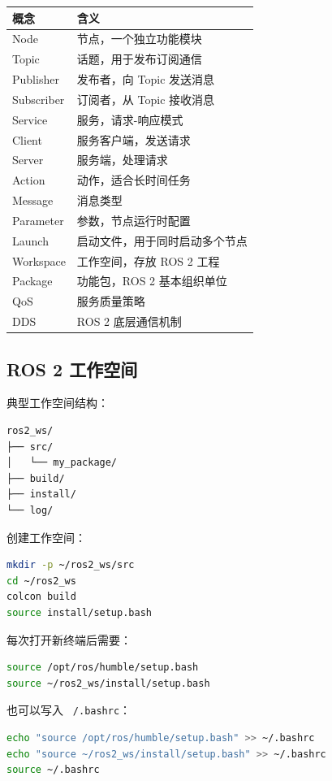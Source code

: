 \documentclass[UTF8,a4paper,12pt]{ctexart}
\begin{document}
\begin{longtable}{p{4cm}p{10cm}}
\toprule
概念 & 含义 \\
\midrule
Node & 节点，一个独立功能模块 \\
Topic & 话题，用于发布订阅通信 \\
Publisher & 发布者，向 Topic 发送消息 \\
Subscriber & 订阅者，从 Topic 接收消息 \\
Service & 服务，请求-响应模式 \\
Client & 服务客户端，发送请求 \\
Server & 服务端，处理请求 \\
Action & 动作，适合长时间任务 \\
Message & 消息类型 \\
Parameter & 参数，节点运行时配置 \\
Launch & 启动文件，用于同时启动多个节点 \\
Workspace & 工作空间，存放 ROS 2 工程 \\
Package & 功能包，ROS 2 基本组织单位 \\
QoS & 服务质量策略 \\
DDS & ROS 2 底层通信机制 \\
\bottomrule
\end{longtable}

\subsection{ROS 2 工作空间}

典型工作空间结构：

\begin{lstlisting}
ros2_ws/
├── src/
│   └── my_package/
├── build/
├── install/
└── log/
\end{lstlisting}

创建工作空间：

\begin{lstlisting}[language=bash]
mkdir -p ~/ros2_ws/src
cd ~/ros2_ws
colcon build
source install/setup.bash
\end{lstlisting}

每次打开新终端后需要：

\begin{lstlisting}[language=bash]
source /opt/ros/humble/setup.bash
source ~/ros2_ws/install/setup.bash
\end{lstlisting}

也可以写入 \texttt{~/.bashrc}：

\begin{lstlisting}[language=bash]
echo "source /opt/ros/humble/setup.bash" >> ~/.bashrc
echo "source ~/ros2_ws/install/setup.bash" >> ~/.bashrc
source ~/.bashrc
\end{lstlisting}
\end{document}

